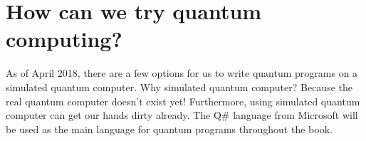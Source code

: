 \section{\textbf{How} can we try quantum computing?}
As of April 2018, there are a few options for us to write quantum programs on a simulated quantum computer.
Why simulated quantum computer? Because the real quantum computer doesn't exist yet!
Furthermore, using simulated quantum computer can get our hands dirty already.
The Q# language from Microsoft will be used as the main language for quantum programs throughout the book.